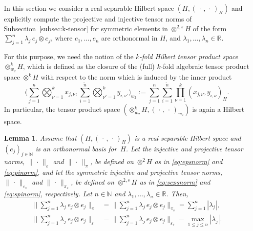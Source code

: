 \documentclass[reqno]{amsart}
\numberwithin{equation}{section}
\newcommand{\bbN}{\mathbb{N}}
\newcommand{\bbR}{\mathbb{R}}
\newcommand{\xk}{\otimes^k}
\newcommand{\norm}[2]{     \| #1       \|_{ #2 }}
\newcommand{\scalar}[2]{     ( #1       )_{ #2 }}
\newcommand{\eps}{\varepsilon}
\newtheorem{lemma}{Lemma}[section]
\theoremstyle{remark}
\theoremstyle{definition}
\begin{document}
In this section we consider a real separable 
Hilbert space $(H, \scalar{\,\cdot\,, \,\cdot\,}{H})$  
and explicitly compute the 
projective and injective tensor norms 
of Subsection~\ref{subsec:k-tensor} 
for symmetric elements in $\otimes^{2,s} H$ 
of the form $\sum_{j=1}^n \lambda_j\, e_j \otimes e_j$, 
where $e_1,\ldots,e_n$ 
are orthonormal in $H$,  
and $\lambda_1,\ldots,\lambda_n\in\bbR$. 

For this purpose, 
we need the notion of the 
\emph{$k$-fold Hilbert tensor product space} 
$\xk_{w_2} H$,  
which is defined as the closure 
of the (full) $k$-fold algebraic tensor product space 
$\xk H$ with respect to the norm 
which is induced by the inner product 
%
\begin{equation}\label{eq:Hilbert-tensor-IP} 
	\biggl( \sum_{j=1}^n 
	\bigotimes_{\nu=1}^k 
	x_{j,\nu}, 
	\sum_{i=1}^{\widetilde{n}} 
	\bigotimes_{\nu'=1}^k 
	y_{i,\nu'}
	\biggr)_{\!w_2}
	:= 
	\sum_{j=1}^n 
	\sum_{i=1}^{\widetilde{n}} 
	\prod_{\nu=1}^k
	\scalar{x_{j,\nu}, y_{i,\nu}}{H}. 
\end{equation}
% 
In particular, the tensor product space 
$(\xk_{w_2} H, \scalar{\,\cdot\,, \,\cdot\,}{w_2}  )$ 
is again a Hilbert space. 

\begin{lemma}\label{lem:diagonal-norms}
	Assume that $(H, \scalar{\,\cdot\,, \,\cdot\,}{H})$ 
	is a real separable Hilbert space 
	and $(e_j)_{j\in\bbN}$ is an orthonormal basis for~$H$. 
	Let the injective and projective tensor norms, 
	$\norm{\,\cdot\,}{\eps}$ and $\norm{\,\cdot\,}{\pi}$, 
	be defined on $\otimes^2 H$
	as in \eqref{eq:epsnorm} and \eqref{eq:pinorm},  
	and let the symmetric injective and projective tensor norms,  
	$\norm{\,\cdot\,}{\eps_s}$ and $\norm{\,\cdot\,}{\pi_s}$,  
	be defined on $\otimes^{2,s} H$ as in 
	\eqref{eq:sepsnorm} and \eqref{eq:spinorm}, respectively. 
	Let $n\in\bbN$ and $\lambda_1,\ldots,\lambda_n\in\bbR$. 
	Then, 
	\begin{align} 
		\biggl\| \sum_{j=1}^n \lambda_j \, e_j \otimes e_j \biggr\|_{\pi}
		&= 
		\biggl\| \sum_{j=1}^n \lambda_j \, e_j \otimes e_j \biggr\|_{\pi_s}
		= 
		\sum_{j=1}^n |\lambda_j|, 
		\label{eq:diagonal-pi-norms}
		\\ 
		\biggl\| \sum_{j=1}^n \lambda_j \, e_j \otimes e_j \biggr\|_{\eps}
		&= 
		\biggl\| \sum_{j=1}^n \lambda_j \, e_j \otimes e_j \biggr\|_{\eps_s}
		= 
		\max_{1\leq j\leq n} |\lambda_j|. 
		\label{eq:diagonal-eps-norms}
	\end{align} 
\end{lemma} 
\end{document}
